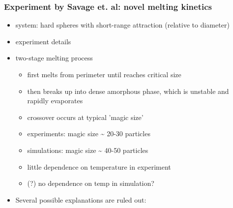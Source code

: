 \documentclass[11pt]{article}
\begin{document}
\subsubsection{Experiment by Savage et. al: novel melting kinetics}
\label{sec-3.1.2}

\begin{itemize}

\item system: hard spheres with short-range attraction (relative to diameter)\\
\label{sec-3.1.2.1}


\item experiment details\\
\label{sec-3.1.2.2}


\item two-stage melting process\\
\label{sec-3.1.2.3}

\begin{itemize}

\item first melts from perimeter until reaches critical size\\
\label{sec-3.1.2.3.1}


\item then breaks up into dense amorphous phase, which is unstable and rapidly evaporates\\
\label{sec-3.1.2.3.2}


\item crossover occurs at typical 'magic size'\\
\label{sec-3.1.2.3.3}


\item experiments: magic size \~{} 20-30 particles\\
\label{sec-3.1.2.3.4}


\item simulations: magic size \~{} 40-50 particles\\
\label{sec-3.1.2.3.5}


\item little dependence on temperature in experiment\\
\label{sec-3.1.2.3.6}


\item (?) no dependence on temp in simulation?\\
\label{sec-3.1.2.3.7}

\end{itemize} %

\item Several possible explanations are ruled out:\\
\label{sec-3.1.2.4}


\end{itemize}
\end{document}
